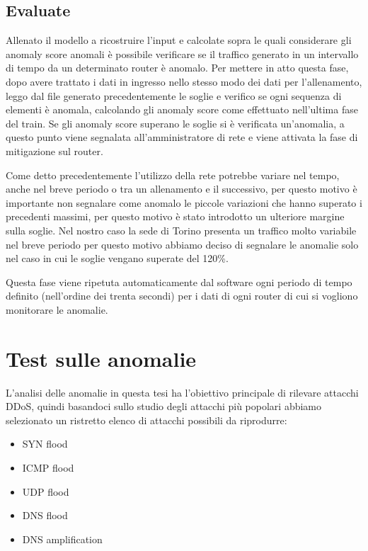 \subsection{Evaluate}
Allenato il modello a ricostruire l'input e calcolate sopra le quali considerare gli anomaly score anomali è possibile verificare se il traffico generato in un intervallo di tempo da un determinato router è anomalo.  
Per mettere in atto questa fase, dopo avere trattato i dati in ingresso nello stesso modo dei dati per l'allenamento, leggo dal file generato precedentemente le soglie e verifico se ogni sequenza di elementi è anomala, calcolando gli anomaly score come effettuato nell'ultima fase del train. Se gli anomaly score superano le soglie si è verificata un'anomalia, a questo punto viene segnalata all'amministratore di rete e viene attivata la fase di mitigazione sul router.

Come detto precedentemente l'utilizzo della rete potrebbe variare nel tempo, anche nel breve periodo o tra un allenamento e il successivo, per questo motivo è importante non segnalare come anomalo le piccole variazioni che hanno superato i precedenti massimi, per questo motivo è stato introdotto un ulteriore margine sulla soglie. Nel nostro caso la sede di Torino presenta un traffico molto variabile nel breve periodo per questo motivo abbiamo deciso di segnalare le anomalie solo nel caso in cui le soglie vengano superate del 120\%.

Questa fase viene ripetuta automaticamente dal software ogni periodo di tempo definito (nell'ordine dei trenta secondi) per i dati di ogni router di cui si vogliono monitorare le anomalie.


\section{Test sulle anomalie}

L'analisi delle anomalie in questa tesi ha l'obiettivo principale di rilevare attacchi DDoS, quindi basandoci sullo studio degli attacchi più popolari abbiamo selezionato un ristretto elenco di attacchi possibili da riprodurre:
\begin{itemize}
    \item SYN flood
    \item ICMP flood
    \item UDP flood
    \item DNS flood
    \item DNS amplification
\end{itemize}

